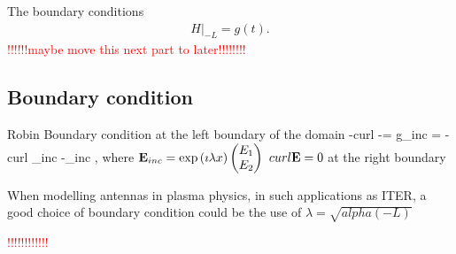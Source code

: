 The boundary conditions
\begin{align*}
H|_{-L}=g(t).
\end{align*}
\textcolor{red}{!!!!!!maybe move this next part to later!!!!!!!!}
\subsection{Boundary condition}
Robin Boundary condition at the left boundary of the domain
\be
-curl \E -\imath \lambda\E \wedge \n = g_{inc} = -curl \E_{inc} -\imath \lambda\E_{inc} \wedge \n,
\ee
where ${\bf E}_{inc} = \exp \left(\imath \lambda x\right)\begin{pmatrix} E_1\\ E_2 \end{pmatrix}$
$curl {\bf E} = 0$ at the right boundary
\begin{remark}
When modelling antennas in plasma physics, in such applications as ITER, a good choice of boundary condition could be the use of $\lambda = \sqrt{alpha(-L)}$
\end{remark}
\textcolor{red}{!!!!!!!!!!!!}